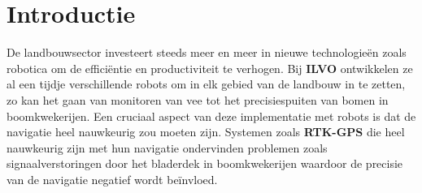 
\section{Introductie}%
\label{sec:introductie}
De landbouwsector investeert steeds meer en meer in nieuwe technologieën zoals robotica om de efficiëntie en productiviteit te verhogen.
Bij \textbf{ILVO} ontwikkelen ze al een tijdje verschillende robots om in elk gebied van de landbouw in te zetten, zo kan het gaan van monitoren van vee tot het precisiespuiten van bomen in boomkwekerijen.
Een cruciaal aspect van deze implementatie met robots is dat de navigatie heel nauwkeurig zou moeten zijn.
Systemen zoals \textbf{RTK-GPS} die heel nauwkeurig zijn met hun navigatie ondervinden problemen zoals signaalverstoringen door het bladerdek in boomkwekerijen waardoor de precisie van de navigatie negatief wordt beïnvloed.\newline

